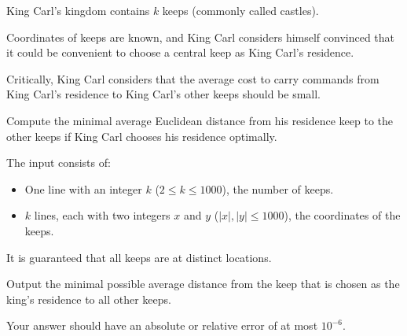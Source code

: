 

\newcommand{\maxn}{1000}
\newcommand{\maxx}{1000}

King Carl's kingdom contains $k$ keeps (commonly called castles).

Coordinates of keeps are known, and King Carl considers himself convinced that
it could be convenient to choose a central keep as King Carl's residence.

Critically, King Carl considers that the average cost to carry commands from
King Carl's residence to King Carl's other keeps should be small.

Compute the minimal average Euclidean distance\footnotemark{} from his residence keep to the
other keeps if King Carl chooses his residence optimally.

\begin{Input}
    The input consists of:
    \begin{itemize}
        \item One line with an integer $k$ ($2\leq k\leq \maxn$), the number of keeps.
        \item $k$ lines, each with two integers $x$ and $y$ ($|x|, |y| \leq \maxx$), the coordinates of the keeps.
    \end{itemize}
    It is guaranteed that all keeps are at distinct locations.
\end{Input}

\begin{Output}
    Output the minimal possible average distance from the keep that is chosen as the king's residence to all other keeps.

    Your answer should have an absolute or relative error of at most $10^{-6}$.
\end{Output}

